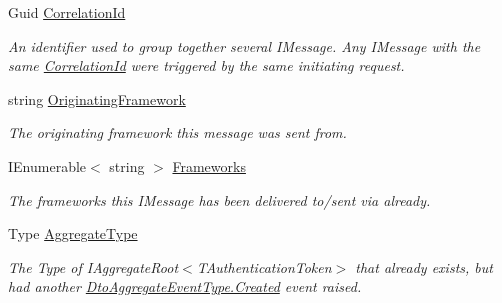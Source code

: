 \begin{DoxyCompactItemize}
Guid \hyperlink{classCqrs_1_1Events_1_1DuplicateCreateCommandEvent_a7a47624fa44952499c87458257184079_a7a47624fa44952499c87458257184079}{Correlation\+Id}
\begin{DoxyCompactList}\small\item\em An identifier used to group together several I\+Message. Any I\+Message with the same \hyperlink{classCqrs_1_1Events_1_1DuplicateCreateCommandEvent_a7a47624fa44952499c87458257184079_a7a47624fa44952499c87458257184079}{Correlation\+Id} were triggered by the same initiating request. \end{DoxyCompactList}\item 
string \hyperlink{classCqrs_1_1Events_1_1DuplicateCreateCommandEvent_a9f3b0ffe268a9be9895009b3f8894727_a9f3b0ffe268a9be9895009b3f8894727}{Originating\+Framework}
\begin{DoxyCompactList}\small\item\em The originating framework this message was sent from. \end{DoxyCompactList}\item 
I\+Enumerable$<$ string $>$ \hyperlink{classCqrs_1_1Events_1_1DuplicateCreateCommandEvent_a9cef5da3d0b1481cd3ec9fd448d501af_a9cef5da3d0b1481cd3ec9fd448d501af}{Frameworks}
\begin{DoxyCompactList}\small\item\em The frameworks this I\+Message has been delivered to/sent via already. \end{DoxyCompactList}\item 
Type \hyperlink{classCqrs_1_1Events_1_1DuplicateCreateCommandEvent_ab08eddd7b1f812bdd62103017fd64f7e_ab08eddd7b1f812bdd62103017fd64f7e}{Aggregate\+Type}
\begin{DoxyCompactList}\small\item\em The Type of I\+Aggregate\+Root$<$\+T\+Authentication\+Token$>$ that already exists, but had another \hyperlink{namespaceCqrs_1_1Events_a2a32e13adeac92f5a93966cd8ee2d39a_a2a32e13adeac92f5a93966cd8ee2d39aa0eceeb45861f9585dd7a97a3e36f85c6}{Dto\+Aggregate\+Event\+Type.\+Created} event raised. \end{DoxyCompactList}\item 

\end{DoxyCompactItemize}
